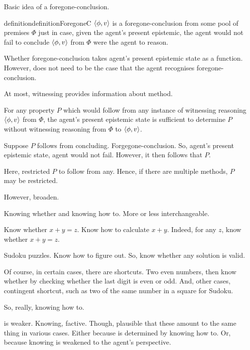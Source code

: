 \begin{note}
  Basic idea of a foregone-conclusion.

  \begin{restatable}{definition}{definitionForegoneC}
    \(\langle \phi, v \rangle\) is a foregone-conclusion from some pool of premises \(\Phi\) just in case, given the agent's present epistemic, the agent would not fail to conclude \(\langle \phi, v \rangle\) from \(\Phi\) were the agent to reason.
  \end{restatable}

  Whether foregone-conclusion takes agent's present epistemic state as a function.
  However, does not need to be the case that the agent recognises foregone-conclusion.

  At most, witnessing provides information about method.

  For any property \(P\) which would follow from any instance of witnessing reasoning \(\langle \phi, v \rangle\) from \(\Phi\), the agent's present epistemic state is sufficient to determine \(P\) without witnessing reasoning from \(\Phi\) to \(\langle \phi, v \rangle\).

  Suppose \(P\) follows from concluding.
  Forgegone-conclusion.
  So, agent's present epistemic state, agent would not fail.
  However, it then follows that \(P\).

  Here, restricted \(P\) to follow from any.
  Hence, if there are multiple methods, \(P\) may be restricted.

  However, broaden.
\end{note}

\begin{note}
  Knowing whether and knowing how to.
  More or less interchangeable.

  Know whether \(x + y = z\).
  Know how to calculate \(x + y\).
  Indeed, for any \(z\), know whether \(x + y = z\).

  Sudoku puzzles.
  Know how to figure out.
  So, know whether any solution is valid.

  Of course, in certain cases, there are shortcuts.
  Two even numbers, then know whether by checking whether the last digit is even or odd.
  And, other cases, contingent shortcut, such as two of the same number in a square for Sudoku.

  So, really, knowing how to.
\end{note}

\begin{note}[Weaken]
   is weaker.
  Knowing, factive.
  Though, plausible that these amount to the same thing in various cases.
  Either because \fc{} is determined by knowing how to.
  Or, because knowing is weakened to the agent's perspective.
\end{note}

